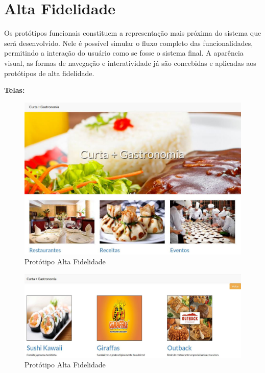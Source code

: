 \section{Alta Fidelidade}

Os protótipos funcionais constituem a representação mais próxima do sistema que será desenvolvido. Nele é possível simular o fluxo completo das funcionalidades, permitindo a interação do usuário como se fosse o sistema final. A aparência visual, as formas de navegação e interatividade já são concebidas e aplicadas aos protótipos de alta fidelidade.

\textbf{Telas:}

\begin{figure}[H]
	\begin{center}
		\includegraphics[keepaspectratio,scale=0.3]{figuras/alta_fidelidade/prototipo1.eps}
		\caption{Protótipo Alta Fidelidade}
	\end{center}
\end{figure}

\begin{figure}[H]
	\begin{center}
		\includegraphics[keepaspectratio,scale=0.3]{figuras/alta_fidelidade/prototipo2.eps}
		\caption{Protótipo Alta Fidelidade}
	\end{center}
\end{figure}

